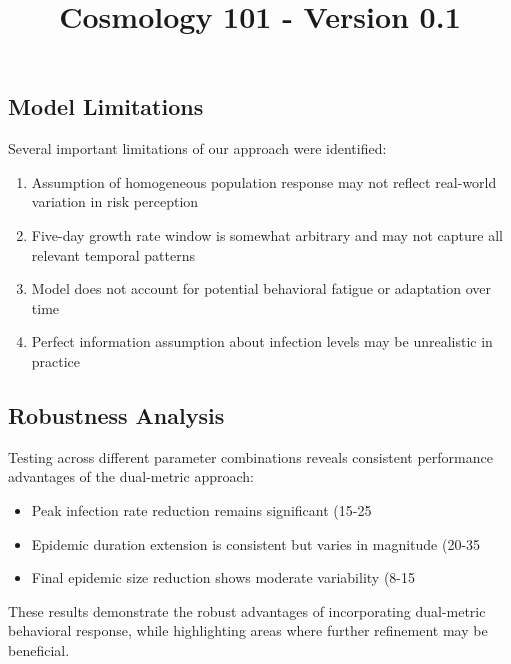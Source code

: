 \documentclass{article}\usepackage{graphicx} \usepackage{amsmath} \usepackage{colortbl}\title{Cosmology 101 - Version 0.1}
\begin{document}
\subsection{Model Limitations}

Several important limitations of our approach were identified:

\begin{enumerate}
\item Assumption of homogeneous population response may not reflect real-world variation in risk perception
\item Five-day growth rate window is somewhat arbitrary and may not capture all relevant temporal patterns
\item Model does not account for potential behavioral fatigue or adaptation over time
\item Perfect information assumption about infection levels may be unrealistic in practice
\end{enumerate}

\subsection{Robustness Analysis}

Testing across different parameter combinations reveals consistent performance advantages of the dual-metric approach:

\begin{itemize}
\item Peak infection rate reduction remains significant (15-25%
\item Epidemic duration extension is consistent but varies in magnitude (20-35%
\item Final epidemic size reduction shows moderate variability (8-15%
\end{itemize}

These results demonstrate the robust advantages of incorporating dual-metric behavioral response, while highlighting areas where further refinement may be beneficial.
\end{document}
